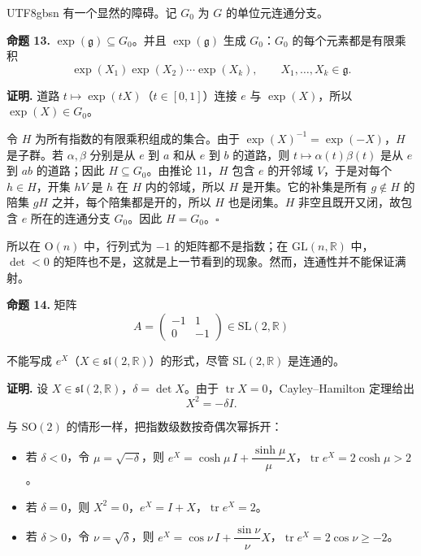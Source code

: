 \documentclass[11pt]{article}
\begin{document}
\begin{CJK*}{UTF8}{gbsn}
有一个显然的障碍。记 $G_0$ 为 $G$ 的单位元连通分支。

\textbf{命题 13.} $\exp(\mathfrak{g}) \subseteq G_0$。并且 $\exp(\mathfrak{g})$ 生成 $G_0$：$G_0$ 的每个元素都是有限乘积
\[
\exp(X_1) \exp(X_2) \cdots \exp(X_k), \qquad X_1, \dots, X_k \in \mathfrak{g}.
\]

\textbf{证明.} 道路 $t \mapsto \exp(tX)$（$t \in [0, 1]$）连接 $e$ 与 $\exp(X)$，所以 $\exp(X) \in G_0$。

令 $H$ 为所有指数的有限乘积组成的集合。由于 $\exp(X)^{-1} = \exp(-X)$，$H$ 是子群。若 $\alpha, \beta$ 分别是从 $e$ 到 $a$ 和从 $e$ 到 $b$ 的道路，则 $t \mapsto \alpha(t)\beta(t)$ 是从 $e$ 到 $ab$ 的道路；因此 $H \subseteq G_0$。由推论 11，$H$ 包含 $e$ 的开邻域 $V$，于是对每个 $h \in H$，开集 $hV$ 是 $h$ 在 $H$ 内的邻域，所以 $H$ 是开集。它的补集是所有 $g \notin H$ 的陪集 $gH$ 之并，每个陪集都是开的，所以 $H$ 也是闭集。$H$ 非空且既开又闭，故包含 $e$ 所在的连通分支 $G_0$。因此 $H = G_0$。$\square$

所以在 $\mathrm{O}(n)$ 中，行列式为 $-1$ 的矩阵都不是指数；在 $\mathrm{GL}(n, \mathbb{R})$ 中，$\det < 0$ 的矩阵也不是，这就是上一节看到的现象。然而，连通性并不能保证满射。

\textbf{命题 14.} 矩阵
\[
A = \begin{pmatrix} -1 & 1 \\ 0 & -1 \end{pmatrix} \in \mathrm{SL}(2, \mathbb{R})
\]

不能写成 $e^X$（$X \in \mathfrak{sl}(2, \mathbb{R})$）的形式，尽管 $\mathrm{SL}(2, \mathbb{R})$ 是连通的。

\textbf{证明.} 设 $X \in \mathfrak{sl}(2, \mathbb{R})$，$\delta = \det X$。由于 $\operatorname{tr} X = 0$，Cayley–Hamilton 定理给出
\[
X^2 = -\delta I.
\]

与 $\mathrm{SO}(2)$ 的情形一样，把指数级数按奇偶次幂拆开：

\begin{itemize}
  \item 若 $\delta < 0$，令 $\mu = \sqrt{-\delta}$，则 $e^X = \cosh\mu\, I + \dfrac{\sinh \mu}{\mu} X$，$\operatorname{tr} e^X = 2\cosh \mu > 2$。
  \item 若 $\delta = 0$，则 $X^2 = 0$，$e^X = I + X$，$\operatorname{tr} e^X = 2$。
  \item 若 $\delta > 0$，令 $\nu = \sqrt{\delta}$，则 $e^X = \cos\nu\, I + \dfrac{\sin \nu}{\nu} X$，$\operatorname{tr} e^X = 2\cos \nu \ge -2$。
\end{itemize}


\end{CJK*}
\end{document}
